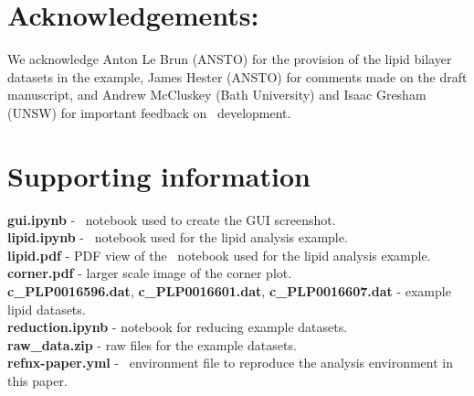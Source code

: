 \documentclass[pdf,preprint]{article}
\begin{document}
\section*{Acknowledgements:}
We acknowledge Anton Le Brun (ANSTO) for the provision of the lipid bilayer datasets in the example, James Hester (ANSTO) for comments made on the draft manuscript, and Andrew McCluskey (Bath University) and Isaac Gresham (UNSW) for important feedback on \ development.

\section{Supporting information}

\noindent
\textbf{gui.ipynb} - \Jupyter\ notebook used to create the GUI screenshot.\\
\textbf{lipid.ipynb} - \Jupyter\ notebook used for the lipid analysis example.\\
\textbf{lipid.pdf} - PDF view of the \Jupyter\ notebook used for the lipid analysis example.\\
\textbf{corner.pdf} - larger scale image of the corner plot.\\
\textbf{c\_PLP0016596.dat}, \textbf{c\_PLP0016601.dat}, \textbf{c\_PLP0016607.dat} - example lipid datasets.\\
\textbf{reduction.ipynb} - notebook for reducing example datasets.\\
\textbf{raw\_data.zip} - raw files for the example datasets.\\
\textbf{refnx-paper.yml} - \conda\ environment file to reproduce the analysis environment in this paper.



\end{document}
